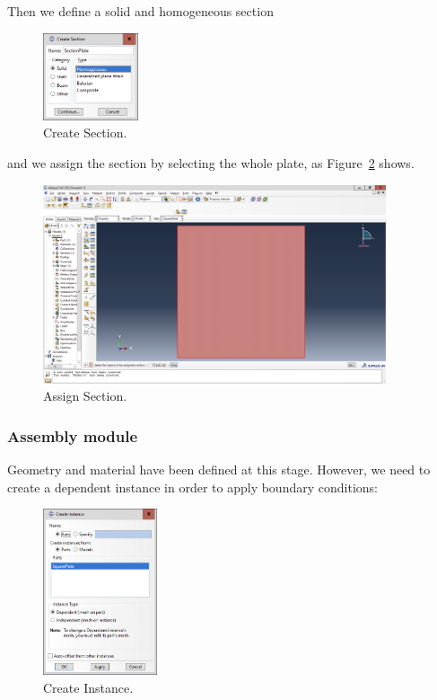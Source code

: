 Then we define a solid and homogeneous section
\begin{figure}[H]
    \centering
    \includegraphics[width=0.25\textwidth]{Images/ab2/ab4.png}
    \caption{Create Section.}
    \label{fig:ab4}
\end{figure}

and we assign the section by selecting the whole plate, as Figure~\ref{fig:ab5} shows.

\begin{figure}[H]
    \centering
    \includegraphics[width=0.9\textwidth]{Images/ab2/ab5.png}
    \caption{Assign Section.}
    \label{fig:ab5}
\end{figure}

\subsubsection{Assembly module}

Geometry and material have been defined at this stage. However, we need to create a dependent instance in order to apply boundary conditions:
\begin{figure}[H]
    \centering
    \includegraphics[width=0.3\textwidth]{Images/ab2/ab6.png}
    \caption{Create Instance.}
    \label{fig:ab6}
\end{figure}

